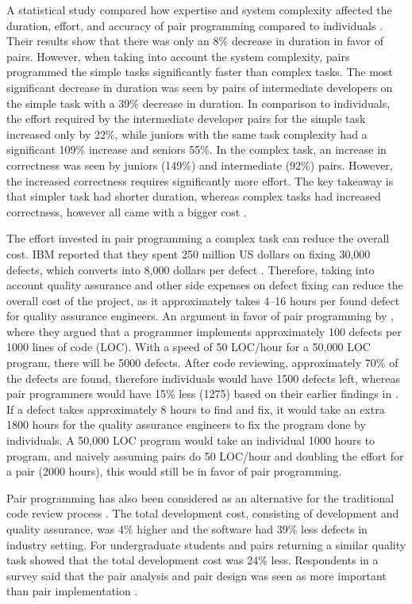 \documentclass[conference]{IEEEtran}
\begin{document}
A statistical study compared how expertise and system complexity affected the duration, effort, and accuracy of pair programming compared to individuals \cite{Arisholm2007Evaluating}. Their results show that there was only an 8\% decrease in duration in favor of pairs. However, when taking into account the system complexity, pairs programmed the simple tasks significantly faster than complex tasks. The most significant decrease in duration was seen by pairs of intermediate developers on the simple task with a 39\% decrease in duration. In comparison to individuals, the effort required by the intermediate developer pairs for the simple task increased only by 22\%, while juniors with the same task complexity had a significant 109\% increase and seniors 55\%. In the complex task, an increase in correctness was seen by juniors (149\%) and intermediate (92\%) pairs. However, the increased correctness requires significantly more effort. The key takeaway is that simpler task had shorter duration, whereas complex tasks had increased correctness, however all came with a bigger cost \cite{Arisholm2007Evaluating}.

The effort invested in pair programming a complex task can reduce the overall cost. IBM reported that they spent 250 million US dollars on fixing 30,000 defects, which converts into 8,000 dollars per defect \cite{10.5555/377517.377531}. Therefore, taking into account quality assurance and other side expenses on defect fixing can reduce the overall cost of the project, as it approximately takes 4--16 hours per found defect for quality assurance engineers. An argument in favor of pair programming by \cite{10.5555/377517.377531}, where they argued that a programmer implements approximately 100 defects per 1000 lines of code (LOC). With a speed of 50 LOC/hour for a 50,000 LOC program, there will be 5000 defects. After code reviewing, approximately 70\% of the defects are found, therefore individuals would have 1500 defects left, whereas pair programmers would have 15\% less (1275) based on their earlier findings in \cite{Williams2000Strengthening}. If a defect takes approximately 8 hours to find and fix, it would take an extra 1800 hours for the quality assurance engineers to fix the program done by individuals. A 50,000 LOC program would take an individual 1000 hours to program, and naively assuming pairs do 50 LOC/hour and doubling the effort for a pair (2000 hours), this would still be in favor of pair programming. 

Pair programming has also been considered as an alternative for the traditional code review process \cite{10.1145/1159733.1159749}. The total development cost, consisting of development and quality assurance, was 4\% higher and the software had 39\% less defects in industry setting. For undergraduate students and pairs returning a similar quality task showed that the total development cost was 24\% less. Respondents in a survey said that the pair analysis and pair design was seen as more important than pair implementation \cite{Williams2000Strengthening}. 
\end{document}
